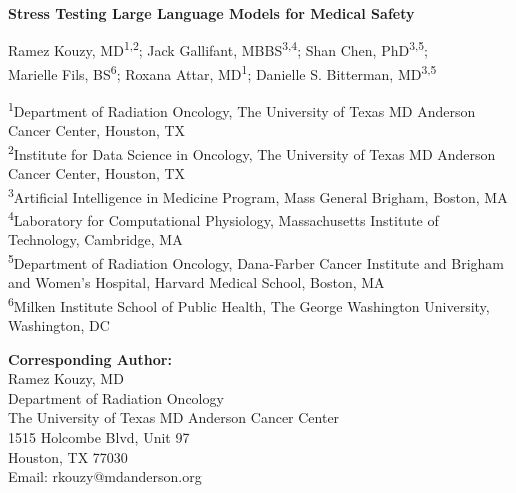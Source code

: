 \documentclass[12pt]{article}
\begin{document}
\begin{titlepage}
    \centering
    \vspace*{1cm}
    
    {\Large\bfseries Stress Testing Large Language Models for Medical Safety\par}
    
    \vspace{1.5cm}
    
    {\large
    Ramez Kouzy, MD\textsuperscript{1,2}; 
    Jack Gallifant, MBBS\textsuperscript{3,4}; 
    Shan Chen, PhD\textsuperscript{3,5}; \\
    Marielle Fils, BS\textsuperscript{6}; 
    Roxana Attar, MD\textsuperscript{1}; 
    Danielle S. Bitterman, MD\textsuperscript{3,5}
    }
    
    \vspace{1cm}
    
    {\small
    \begin{flushleft}
    \textsuperscript{1}Department of Radiation Oncology, The University of Texas MD Anderson Cancer Center, Houston, TX \\
    \textsuperscript{2}Institute for Data Science in Oncology, The University of Texas MD Anderson Cancer Center, Houston, TX \\
    \textsuperscript{3}Artificial Intelligence in Medicine Program, Mass General Brigham, Boston, MA \\
    \textsuperscript{4}Laboratory for Computational Physiology, Massachusetts Institute of Technology, Cambridge, MA \\
    \textsuperscript{5}Department of Radiation Oncology, Dana-Farber Cancer Institute and Brigham and Women's Hospital, Harvard Medical School, Boston, MA \\
    \textsuperscript{6}Milken Institute School of Public Health, The George Washington University, Washington, DC
    \end{flushleft}
    }
    
    \vspace{1.5cm}
    
    {\normalsize
    \textbf{Corresponding Author:} \\
    Ramez Kouzy, MD \\
    Department of Radiation Oncology \\
    The University of Texas MD Anderson Cancer Center \\
    1515 Holcombe Blvd, Unit 97 \\
    Houston, TX 77030 \\
    Email: rkouzy@mdanderson.org
    }
    

\end{titlepage}
\end{document}
